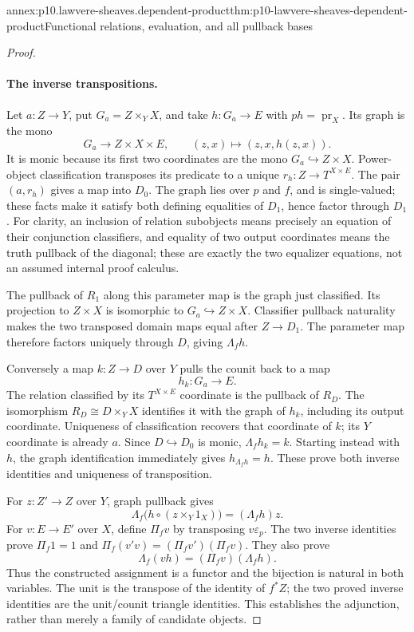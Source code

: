 \begin{annexitem}{annex:p10.lawvere-sheaves.dependent-product}{thm:p10-lawvere-sheaves-dependent-product}{Functional relations, evaluation, and all pullback bases}
\begin{proof}
\paragraph{The inverse transpositions.}
Let \(a:Z\to Y\), put \(G_a=Z\times_Y X\), and take
\(h:G_a\to E\) with \(ph=\operatorname{pr}_X\).
Its graph is the mono
\[
 G_a\longrightarrow Z\times X\times E,
       \qquad (z,x)\longmapsto(z,x,h(z,x)).
\]
It is monic because its first two coordinates are the mono
\(G_a\hookrightarrow Z\times X\).
Power-object classification transposes its predicate to a unique
\(r_h:Z\to T^{X\times E}\).  The pair \((a,r_h)\)
gives a map into \(D_0\).  The graph lies over \(p\) and
\(f\), and is single-valued; these facts make it satisfy both
defining equalities of \(D_1\), hence factor through \(D_1\).
For clarity, an inclusion of relation subobjects means precisely
an equation of their conjunction classifiers, and equality of
two output coordinates means the truth pullback of the diagonal;
these are exactly the two equalizer equations, not an assumed
internal proof calculus.

The pullback of \(R_1\) along this parameter map is the graph
just classified.  Its projection to \(Z\times X\) is
isomorphic to \(G_a\hookrightarrow Z\times X\).
Classifier pullback naturality makes the two transposed domain
maps equal after \(Z\to D_1\).  The parameter map therefore
factors uniquely through \(D\), giving \(\Lambda_f h\).

Conversely a map \(k:Z\to D\) over \(Y\) pulls the counit
back to a map
\[
 h_k:G_a\longrightarrow E.
\]
The relation classified by its \(T^{X\times E}\) coordinate
is the pullback of \(R_D\).  The isomorphism
\(R_D\cong D\times_Y X\) identifies it with the graph of
\(h_k\), including its output coordinate.  Uniqueness of
classification recovers that coordinate of \(k\); its \(Y\)
coordinate is already \(a\).  Since \(D\hookrightarrow D_0\)
is monic, \(\Lambda_fh_k=k\).  Starting instead with \(h\),
the graph identification immediately gives
\(h_{\Lambda_fh}=h\).  These prove both inverse identities
and uniqueness of transposition.

For \(z:Z'\to Z\) over \(Y\), graph pullback gives
\[
 \Lambda_f\bigl(h\circ(z\times_Y1_X)\bigr)
                                  =(\Lambda_fh)z.
\]
For \(v:E\to E'\) over \(X\), define
\(\Pi_fv\) by transposing \(v\varepsilon_p\).
The two inverse identities prove
\(\Pi_f1=1\) and \(\Pi_f(v'v)=(\Pi_fv')(\Pi_fv)\).
They also prove
\[
              \Lambda_f(vh)=(\Pi_fv)(\Lambda_fh).
\]
Thus the constructed assignment is a functor and the bijection
is natural in both variables.  The unit is the transpose of the
identity of \(f^*Z\); the two proved inverse identities are
the unit/counit triangle identities.  This establishes the
adjunction, rather than merely a family of candidate objects.


\end{proof}
\end{annexitem}
